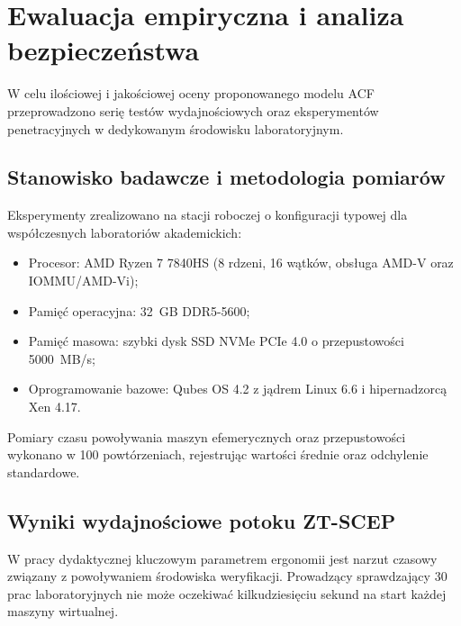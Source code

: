 \section{Ewaluacja empiryczna i analiza bezpieczeństwa}
\label{sec:ewaluacja_empiryczna}

W celu ilościowej i jakościowej oceny proponowanego modelu ACF przeprowadzono serię testów wydajnościowych oraz eksperymentów penetracyjnych w dedykowanym środowisku laboratoryjnym.

\subsection{Stanowisko badawcze i metodologia pomiarów}
Eksperymenty zrealizowano na stacji roboczej o konfiguracji typowej dla współczesnych laboratoriów akademickich:
\begin{itemize}
    \item Procesor: AMD Ryzen 7 7840HS (8 rdzeni, 16 wątków, obsługa AMD-V oraz IOMMU/AMD-Vi);
    \item Pamięć operacyjna: 32~GB DDR5-5600;
    \item Pamięć masowa: szybki dysk SSD NVMe PCIe 4.0 o przepustowości 5000~MB/s;
    \item Oprogramowanie bazowe: Qubes OS 4.2 z jądrem Linux 6.6 i hipernadzorcą Xen 4.17.
\end{itemize}

Pomiary czasu powoływania maszyn efemerycznych oraz przepustowości wykonano w 100 powtórzeniach, rejestrując wartości średnie oraz odchylenie standardowe.

\subsection{Wyniki wydajnościowe potoku ZT-SCEP}
W pracy dydaktycznej kluczowym parametrem ergonomii jest narzut czasowy związany z powoływaniem środowiska weryfikacji. Prowadzący sprawdzający 30 prac laboratoryjnych nie może oczekiwać kilkudziesięciu sekund na start każdej maszyny wirtualnej.

\begin{table}[htbp]
\centering
\caption{Porównanie parametrów rozruchu i narzutu pamięciowego środowisk testowych.}
\label{tab:performance_comparison}
\end{table}

